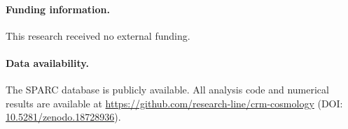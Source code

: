 \documentclass[aps,prd,twocolumn,superscriptaddress,nofootinbib]{revtex4-2}
\begin{document}
\paragraph{Funding information.}
This research received no external funding.

\paragraph{Data availability.}
The SPARC database \cite{Lelli2016} is publicly available.
All analysis code and numerical results are available at
\url{https://github.com/research-line/crm-cosmology}
(DOI: \href{https://doi.org/10.5281/zenodo.18728936}{10.5281/zenodo.18728936}).

\end{document}
